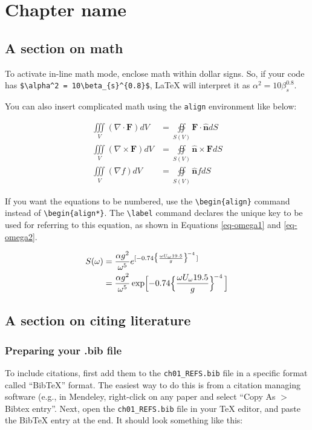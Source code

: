 \chapter{Chapter name}
\section{A section on math}\label{math-sec}
To activate in-line math mode, enclose math within dollar signs. So, if your code has \verb|$\alpha^2 = 10\beta_{s}^{0.8}$|, \LaTeX{} will interpret it as $\alpha^2 = 10\beta_{s}^{0.8}$.

You can also insert complicated math using the \verb|align| environment like below:

\begin{align*}
  \iiint\limits_V(\nabla \cdot \mathbf{F}) dV
      & = \oiint \limits_{S(V)} \mathbf{F \cdot \hat{n}} dS \\
  \iiint\limits_V(\nabla \times \mathbf{F}) dV
      & = \oiint \limits_{S(V)} \mathbf{\hat{n} \times F} dS \\
  \iiint\limits_V(\nabla f) dV
      & = \oiint\limits_{S(V)}\mathbf{\hat{n}}f dS
\end{align*}

If you want the equations to be numbered, use the \verb|\begin{align}| command instead of \verb|\begin{align*}|. The \verb|\label| command declares the unique key to be used for referring to this equation, as shown in Equations \ref{eq-omega1} and \ref{eq-omega2}.

\begin{align}
S(\omega)
&= \frac{\alpha g^2}{\omega^5} e^{[ -0.74\bigl\{\frac{\omega U_\omega 19.5}{g}\bigr\}^{\!-4}\,]}\label{eq-omega1} \\
&= \frac{\alpha g^2}{\omega^5} \exp\Bigl[ -0.74\Bigl\{\frac{\omega U_\omega 19.5}{g}\Bigr\}^{\!-4}\,\Bigr]\label{eq-omega2} 
\end{align}

\section{A section on citing literature}\label{citing-sec}
\subsection{Preparing your .bib file} \label{sec:prepping_bib}
To include citations, first add them to the \verb|ch01_REFS.bib| file in a specific format called ``BibTeX'' format. The easiest way to do this is from a citation managing software (e.g., in Mendeley, right-click on any paper and select ``Copy As $ > $ Bibtex entry''. Next, open the \verb|ch01_REFS.bib| file in your TeX editor, and paste the BibTeX entry at the end. It should look something like this:

